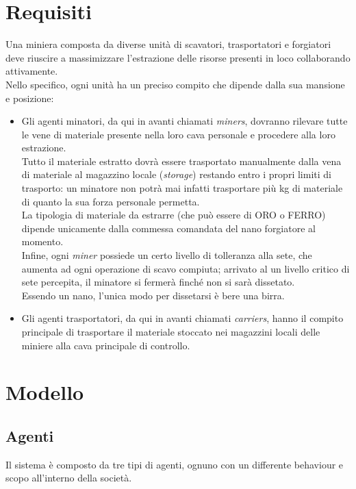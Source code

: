 \documentclass{llncs}
\newcommand{\labelsec}[1]{\label{sec:#1}}
\begin{document}
\section{Requisiti}
Una miniera composta da diverse unità di scavatori, trasportatori e forgiatori deve riuscire a massimizzare l'estrazione delle risorse presenti in loco collaborando attivamente.\\
Nello specifico, ogni unità ha un preciso compito che dipende dalla sua mansione e posizione:
\begin{itemize}
\item Gli agenti minatori, da qui in avanti chiamati \textit{miners}, dovranno rilevare tutte le vene di materiale presente nella loro cava personale e procedere alla loro estrazione.\\
Tutto il materiale estratto dovrà essere trasportato manualmente dalla vena di materiale al magazzino locale (\textit{storage}) restando entro i propri limiti di trasporto: un minatore non potrà mai infatti trasportare più kg di materiale di quanto la sua forza personale permetta.\\
La tipologia di materiale da estrarre (che può essere di ORO o FERRO) dipende unicamente dalla commessa comandata del nano forgiatore al momento.\\Infine, ogni \textit{miner} possiede un certo livello di tolleranza alla sete, che aumenta ad ogni operazione di scavo compiuta; arrivato al un livello critico di sete percepita, il minatore si fermerà finché non si sarà dissetato.\\
Essendo un nano, l'unica modo per dissetarsi è bere una birra.\\
\item Gli agenti trasportatori, da qui in avanti chiamati \textit{carriers}, hanno il compito principale di trasportare il materiale stoccato nei magazzini locali delle miniere alla cava principale di controllo.
\end{itemize}
\newpage
\section{Modello}
\labelsec{Modello}
\subsection{Agenti}
Il sistema è composto da tre tipi di agenti, ognuno con un differente behaviour e scopo all'interno della società.
\newpage
\end{document}
